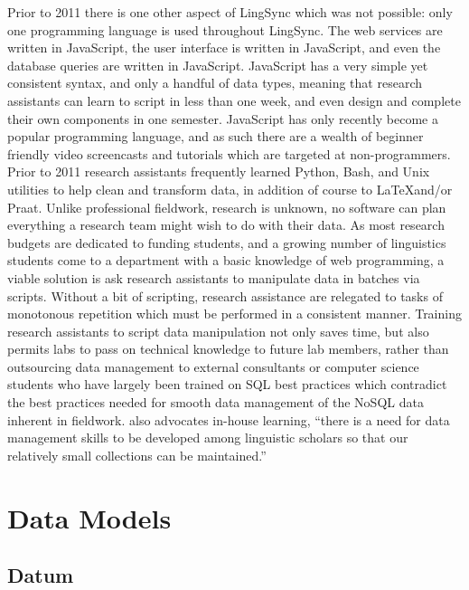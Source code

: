 \documentclass[12pt]{article}
\begin{document}
Prior to 2011 there is one other aspect of LingSync which was not possible: only one programming language is used throughout LingSync. The web services are written in JavaScript, the user interface is written in JavaScript, and even the database queries are written in JavaScript. JavaScript has a very simple yet consistent syntax, and only a handful of data types, meaning that research assistants can learn to script in less than one week, and even design and complete their own components in one semester. JavaScript has only recently become a popular programming language, and as such there are a wealth of beginner friendly video screencasts and tutorials which are targeted at non-programmers. Prior to 2011 research assistants frequently learned Python, Bash, and Unix utilities to help clean and transform data,  in addition of course to \LaTeX  and/or Praat. Unlike professional fieldwork, research is unknown, no software can plan everything a research team might wish to do with their data.  As most research budgets are dedicated to funding students, and a growing number of linguistics students come to a department with a basic knowledge of web programming, a viable solution is ask research assistants to manipulate data in batches via scripts. Without a bit of scripting, research assistance are relegated to tasks of monotonous repetition which must be performed in a consistent manner. Training research assistants to script data manipulation not only saves time, but also permits labs to pass on technical knowledge to future lab members, rather than outsourcing  data management to external consultants or computer science students who have largely been trained on SQL best practices which contradict the best practices  needed for smooth data management of the NoSQL data inherent in fieldwork. \cite{Thieberger:2012} also advocates in-house learning, ``there is a need for data management skills to be developed among linguistic scholars so that our relatively small collections can be maintained.''%

 
\section{Data Models}

\subsection{Datum}
\label{appendix:datumjson}
\end{document}

